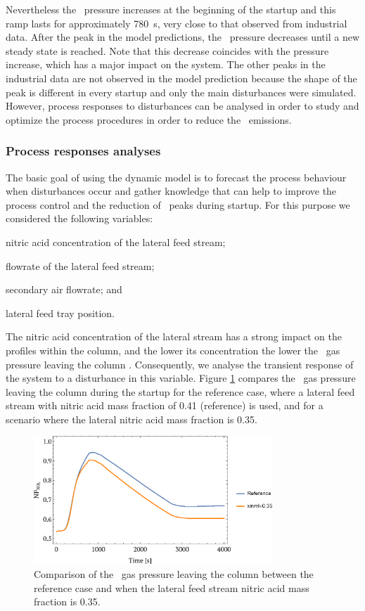 \documentclass[journal=jacsat,manuscript=article]{achemso}
\newcommand{\nox}{\ce{NO_{\rmfamily{x}}}}
\begin{document}
Nevertheless the \nox~pressure increases at the beginning of the startup and this ramp lasts for approximately \SI{780}{\second}, very close to that observed from industrial data. 
After the peak in the model predictions, the \nox~pressure decreases until a new steady state is reached. Note that this decrease coincides with the pressure increase, which has a major impact on the system.
The other peaks in the industrial data are not observed in the model prediction because the shape of the peak is different in every startup and only the main disturbances were simulated. 
However, process responses to disturbances can be analysed in order to study and optimize the process procedures in order to reduce the \nox~emissions.



\subsubsection{Process responses analyses}
The basic goal of using the dynamic model is to forecast the process behaviour when disturbances occur and gather knowledge that can help to improve the process control and the reduction of \nox~peaks during startup. For this purpose we considered the following variables:
\begin{inparaenum}[(i)]
	\item nitric acid concentration of the lateral feed stream;
	\item flowrate of the lateral feed stream;
	\item secondary air flowrate; and
	\item lateral feed tray position.
\end{inparaenum}

The nitric acid concentration of the lateral stream has a strong impact on the profiles within the column, and the lower its concentration the lower the \nox~gas pressure leaving the column \cite{Vilarinho2019}. Consequently, we analyse the transient response of the system to a disturbance in this variable. Figure \ref{fig:startw} compares the \nox~gas pressure leaving the column during the startup for the reference case, where a lateral feed stream with nitric acid mass fraction of 0.41 (reference) is used, and for a scenario where the lateral nitric acid mass fraction is 0.35.

\begin{figure}[htb]
	\centering
	\includegraphics[width=0.8\textwidth]{figure6.eps}
	\caption{Comparison of the \nox~gas pressure leaving the column between the reference case and when the lateral feed stream nitric acid mass fraction is 0.35.} 	
	\label{fig:startw}
\end{figure}
\end{document}
